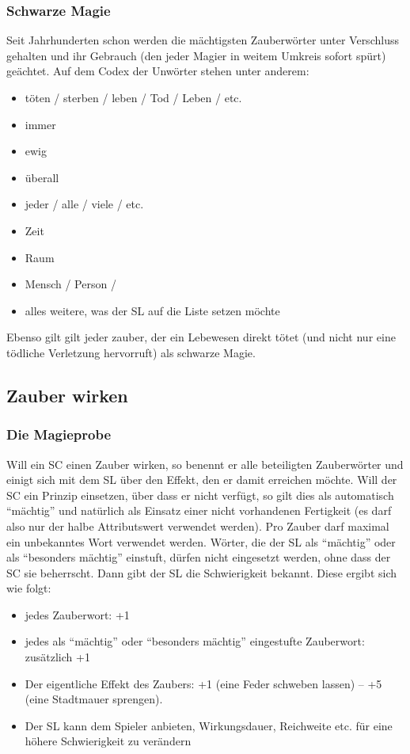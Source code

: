 \subsubsection{Schwarze Magie}

Seit Jahrhunderten schon werden die mächtigsten Zauberwörter unter Verschluss gehalten und ihr Gebrauch (den jeder Magier in weitem Umkreis sofort spürt) geächtet. Auf dem Codex der Unwörter stehen unter anderem:
\begin{itemize}
\item töten / sterben / leben / Tod / Leben / etc.
\item immer
\item ewig
\item überall
\item jeder / alle / viele / etc.
\item Zeit
\item Raum
\item Mensch / Person /
\item alles weitere, was der SL auf die Liste setzen möchte
\end{itemize}
Ebenso gilt gilt jeder zauber, der ein Lebewesen direkt tötet (und nicht nur eine tödliche Verletzung hervorruft) als schwarze Magie.

\subsection{Zauber wirken}

\subsubsection{Die Magieprobe}

Will ein SC einen Zauber wirken, so benennt er alle beteiligten Zauberwörter und einigt sich mit dem SL über den Effekt, den er damit erreichen möchte. Will der SC ein Prinzip einsetzen, über dass er nicht verfügt, so gilt dies als automatisch "`mächtig"' und natürlich als Einsatz einer nicht vorhandenen Fertigkeit (es darf also nur der halbe Attributswert verwendet werden). Pro Zauber darf maximal ein unbekanntes Wort verwendet werden. Wörter, die der SL als "`mächtig"' oder als "`besonders mächtig"' einstuft, dürfen nicht eingesetzt werden, ohne dass der SC sie beherrscht. Dann gibt der SL die Schwierigkeit bekannt. Diese ergibt sich wie folgt:
\begin{itemize}
\item jedes Zauberwort: +1
\item jedes als "`mächtig"' oder "`besonders mächtig"' eingestufte Zauberwort: zusätzlich +1
\item Der eigentliche Effekt des Zaubers: +1 (eine Feder schweben lassen) -- +5 (eine Stadtmauer sprengen).
\item Der SL kann dem Spieler anbieten, Wirkungsdauer, Reichweite etc. für eine höhere Schwierigkeit zu verändern
\end{itemize}


